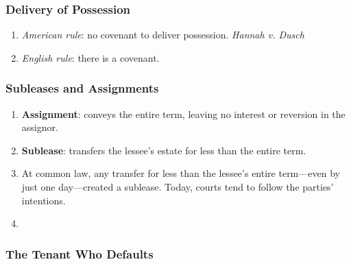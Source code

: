 \subsubsection{Delivery of Possession}

\begin{enumerate}
    \item \emph{American rule}: no covenant to deliver possession.  
    \emph{Hannah v. Dusch}
    \item \emph{English rule}: there is a covenant.
\end{enumerate}

\subsubsection{Subleases and Assignments}

\begin{enumerate}
    \item \textbf{Assignment}: conveys the entire term, leaving no interest or 
    reversion in the assignor.
    \item \textbf{Sublease}: transfers the lessee's estate for less than the 
    entire term.
    \item At common law, any transfer for less than the lessee's entire 
    term---even by just one day---created a sublease. Today, courts tend to 
    follow the parties' intentions.
    \item %
\end{enumerate}

\subsubsection{The Tenant Who Defaults}

